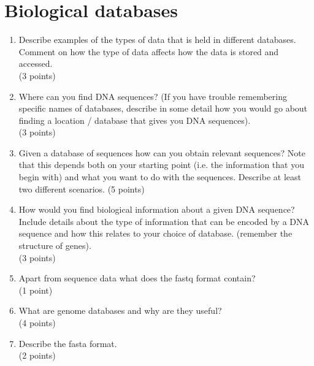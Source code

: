 \documentclass[11pt]{article}
\begin{document}
\section{Biological databases}
\begin{enumerate}
\item Describe examples of the types of data that is held in different
  databases. Comment on how the type of data affects how the data is stored
  and accessed.\\
  (3 points)
\item Where can you find DNA sequences? (If you have trouble remembering
  specific names of databases, describe in some detail how you would go about finding a
  location / database that gives you DNA sequences).\\
  (3 points)
\item Given a database of sequences how can you obtain relevant sequences? Note
  that this depends both on your starting point (i.e. the information that
  you begin with) and what you want to do with the sequences. Describe at least two
  different scenarios.
  (5 points)
\item How would you find biological information about a given DNA sequence?
  Include details about the type of information that can be encoded by a DNA
  sequence and how this relates to your choice of database.
  (remember the structure of genes).\\
  (3 points)
\item Apart from sequence data what does the fastq format contain?\\
  (1 point)
\item What are genome databases and why are they useful?\\
  (4 points)
\item Describe the fasta format.\\
  (2 points)
\end{enumerate}
\end{document}
